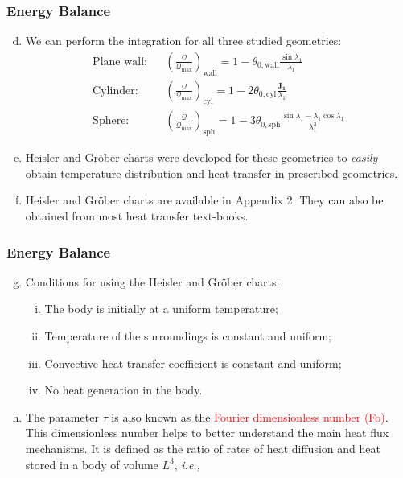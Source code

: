 \documentclass[10pt,compress,unknownkeysallowed]{beamer}
\newcommand{\ie}{{\it i.e., }}
\newcommand{\frc}{\displaystyle\frac}
\newcommand{\red}{\textcolor{red}}
\begin{document}
\begin{frame}
 \frametitle{Energy Balance}
   \begin{enumerate}[(a)]\setcounter{enumi}{3}%
     \item<1-> We can perform the integration for all three  studied geometries:
          \begin{eqnarray}
            \text{Plane wall:} && \left(\frc{\mathcal{Q}}{\mathcal{Q}_{\text{max}}}\right)_{\text{wall}} = 1 - \theta_{0,\text{wall}}\frc{\sin{\lambda_{1}}}{\lambda_{1}} \\
            \text{Cylinder:} && \left(\frc{\mathcal{Q}}{\mathcal{Q}_{\text{max}}}\right)_{\text{cyl}} = 1- 2\theta_{0,\text{cyl}}\frc{\mathbf{J_{1}}}{\lambda_{1}} \\
            \text{Sphere:} && \left(\frc{\mathcal{Q}}{\mathcal{Q}_{\text{max}}}\right)_{\text{sph}} = 1 - 3\theta_{0,\text{sph}}\frc{\sin{\lambda_{1}}-\lambda_{1}\cos{\lambda_{1}}}{\lambda_{1}^{3}}
          \end{eqnarray}
      \item<2-> Heisler and Gr\"ober charts were developed for these geometries to {\it easily} obtain temperature distribution and heat transfer in prescribed geometries. 
      \item<3-> Heisler and Gr\"ober charts are available in Appendix 2. They can also be obtained from most heat transfer text-books.      
   \end{enumerate} 
\end{frame}

\begin{frame}
 \frametitle{Energy Balance}
   \begin{enumerate}[(a)]\setcounter{enumi}{6}%
     \item<1-> Conditions for using the Heisler and Gr\"ober charts:
        \begin{enumerate}[(i)]
           \item<2-> The body is initially at a uniform temperature;
           \item<2-> Temperature of the surroundings is constant and uniform;
           \item<2-> Convective heat transfer coefficient is constant and uniform;
           \item<2-> No heat generation in the body.
        \end{enumerate}
     \item<3-> The parameter $\tau$ is also known as the \red{Fourier dimensionless number (Fo)}. This dimensionless number helps to better understand the main heat flux mechanisms. It is defined as the ratio of rates of heat diffusion and heat stored in a body of volume $L^{3}$, \ie
        \visible<3->{\begin{displaymath}
               Fo = \frc{\alpha t}{L^{2}} = \tau
        \end{displaymath}} 
   \end{enumerate} 
\end{frame}
\end{document}
